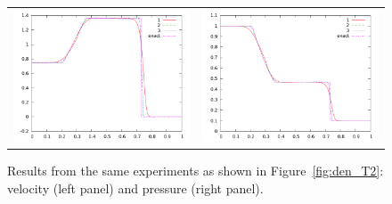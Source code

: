 \documentclass[10pt]{article}
\begin{document}
\begin{figure}
  \begin{center}
	\begin{tabular}{cc}
      \includegraphics[width=.425\textwidth]{vel_T2.png} &
	  \includegraphics[width=.425\textwidth]{prs_T2.png}
	\end{tabular}
  \end{center}
  \caption{Results from the same experiments as shown in Figure~\ref{fig:den_T2}:
  velocity (left panel) and pressure (right panel).}
\end{figure}


\clearpage
\end{document}
